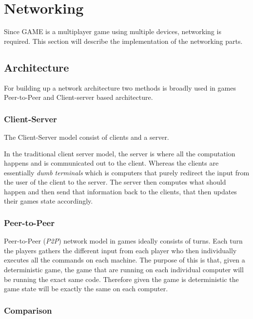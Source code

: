 \section{Networking}
Since GAME is a multiplayer game using multiple devices, networking is required. This section will describe the implementation of the networking parts.

\subsection{Architecture}
For building up a network architecture two methods is broadly used in games Peer-to-Peer and Client-server based architecture. 


\subsubsection{Client-Server}
The Client-Server model consist of clients and a server. 

In the traditional client server model, the server is where all the computation happens and is communicated out to the client.
Whereas the clients are essentially \textit{dumb terminals} which is computers that purely redirect the input from the user of the client to the server. 
The server then computes what should happen and then send that information back to the clients, that then updates their games state accordingly.


\subsubsection{Peer-to-Peer}
Peer-to-Peer (\textit{P2P}) network model in games ideally consists of turns. 
Each turn the players gathers the different input from each player who then individually executes all the commands on each machine.
The purpose of this is that, given a deterministic game, the game that are running on each individual computer will be running the exact same code. 
Therefore given the game is deterministic the game state will be exactly the same on each computer. 

\subsubsection{Comparison}

